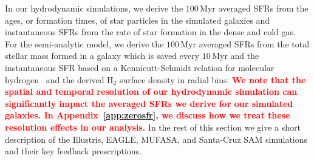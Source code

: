 \documentclass[preprint2,tighten]{aastex62}
\newcommand{\todo}[1]{{\bf \textcolor{red}{ #1}}}
\begin{document}
In our hydrodynamic simulations, we derive the $100\,\mathrm{Myr}$ averaged SFRs 
from the ages, or formation times, of star particles in the simulated galaxies
and instantaneous SFRs from the rate of star formation in the dense and cold 
gas. For the semi-analytic model, we derive the $100\,\mathrm{Myr}$ averaged 
SFRs from the total stellar mass formed in a galaxy which is saved every
$10\,\mathrm{Myr}$ and the instantaneous SFR based on a Kennicutt-Schmidt 
relation for molecular hydrogen~\citep{bigiel2008} and the derived H$_2$ 
surface density in radial bins.
\todo{We note that the spatial and temporal resolution of our hydrodynamic 
simulation can significantly impact the averaged SFRs we derive for our 
simulated galaxies. In Appendix~\ref{app:zerosfr}, we discuss how we treat
these resolution effects in our analysis.}
In the rest of this section we give a short description of the Illustris, 
EAGLE, MUFASA, and Santa-Cruz SAM simulations and their key feedback 
prescriptions. 



\end{document}
